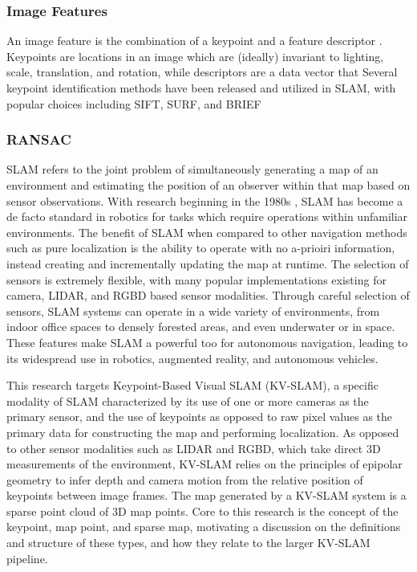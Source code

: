 \subsubsection{Image Features}

An image feature is the combination of a keypoint and a feature descriptor \cite{loweObjectRecognitionLocal1999}. Keypoints are locations in an image which are (ideally) invariant to lighting, scale, translation, and rotation\cite{shiGoodFeaturesTrack1994}, while descriptors are a data vector that Several keypoint identification methods have been released and utilized in SLAM, with popular choices including SIFT\cite{loweObjectRecognitionLocal1999}, SURF\cite{baySURFSpeededRobust2006}, and BRIEF \cite{calonderBRIEFBinaryRobust2010} 

\subsubsection{RANSAC}

SLAM refers to the joint problem of simultaneously generating a map of an environment and estimating the position of an observer within that map based on sensor observations. With research beginning in the 1980s \cite{smithEstimatingUncertainSpatial1988}, SLAM has become a de facto standard in robotics for tasks which require operations within unfamiliar environments. The benefit of SLAM when compared to other navigation methods such as pure localization is the ability to operate with no a-prioiri information, instead creating and incrementally updating the map at runtime. The selection of sensors is extremely flexible, with many popular implementations existing for camera, LIDAR, and RGBD based sensor modalities. Through careful selection of sensors, SLAM systems can operate in a wide variety of environments, from indoor office spaces to densely forested areas, and even underwater or in space.  These features make SLAM a powerful too for autonomous navigation, leading to its widespread use in robotics, augmented reality, and autonomous vehicles.

This research targets Keypoint-Based Visual SLAM (KV-SLAM), a specific modality of SLAM characterized by its use of one or more cameras as the primary sensor, and the use of keypoints as opposed to raw pixel values as the primary data for constructing the map and performing localization. As opposed to other sensor modalities such as LIDAR and RGBD, which take direct 3D measurements of the environment, KV-SLAM relies on the principles of epipolar geometry to infer depth and camera motion from the relative position of keypoints between image frames. The map generated by a KV-SLAM system is a sparse point cloud of 3D map points. Core to this research is the concept of the keypoint, map point, and sparse map, motivating a discussion on the definitions and structure of these types, and how they relate to the larger KV-SLAM pipeline.


